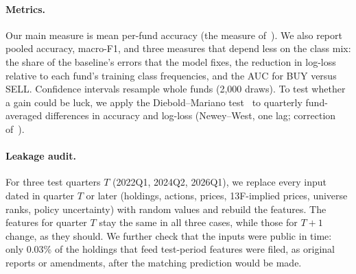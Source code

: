 \paragraph{Metrics.} Our main measure is mean per-fund accuracy (the measure
of~\cite{cohen2026mimicking}). We also report pooled accuracy, macro-F1, and
three measures that depend less on the class mix: the share of the
baseline's errors that the model fixes, the reduction in log-loss relative to
each fund's training class frequencies, and the AUC for BUY versus SELL.
Confidence intervals resample whole funds (2,000 draws). To test whether a
gain could be luck, we apply the Diebold--Mariano
test~\cite{diebold1995comparing} to quarterly fund-averaged differences in
accuracy and log-loss (Newey--West, one lag; correction of~\cite{harvey1997testing}).

\paragraph{Leakage audit.} For three test quarters $T$ (2022Q1, 2024Q2,
2026Q1), we replace every input dated in quarter $T$ or later (holdings,
actions, prices, 13F-implied prices, universe ranks, policy uncertainty) with
random values and rebuild the features. The features for quarter $T$ stay the
same in all three cases, while those for $T+1$ change, as they should. We further check that the inputs
were public in time: only 0.03\% of the holdings that feed test-period
features were filed, as original reports or amendments, after the matching
prediction would be made.

